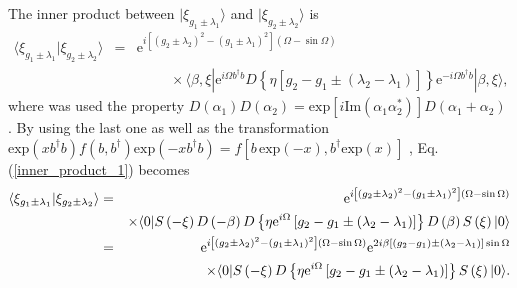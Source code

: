 The inner product between $|\xi_{g_{1}\pm\lambda_{1}}\rangle$ and $|\xi_{g_{2}\pm\lambda_{2}}\rangle$ is
\begin{eqnarray}\label{inner_product_1}
\langle \xi_{g_{1}\pm\lambda_{1}}|\xi_{g_{2}\pm\lambda_{2}}\rangle &=& \textrm{e}^{i\left[\left(g_{2}\pm\lambda_{2}\right)^{2}-\left(g_{1}\pm\lambda_{1}\right)^{2}\right]\left(\Omega-\sin\Omega\right)}\nonumber\\
                                                                     &&\hspace{1cm}\times\langle\beta,\xi|\textrm{e}^{i\Omega b^{\dagger}b}D\left\{\eta\left[g_{2}-g_{1}\pm\left(\lambda_{2}-\lambda_{1}\right)\right]\right\}\textrm{e}^{-i\Omega b^{\dagger}b}|\beta,\xi\rangle,
\end{eqnarray}
where was used the property $D\left(\alpha_{1}\right)D\left(\alpha_{2}\right)=\textrm{exp}\left[i\textrm{Im}\left(\alpha_{1}\alpha_{2}^{*}\right)\right]D\left(\alpha_{1}+\alpha_{2}\right)$ \cite{orszag2016quantum}. By using the last one as well as the transformation $\textrm{exp}\left(xb^{\dagger}b\right)f(b,b^{\dagger})\textrm{exp}\left(-xb^{\dagger}b\right)=f\left[b\,\textrm{exp}\left(-x\right),b^{\dagger}\textrm{exp}\left(x\right)\right]$ \cite{louisell1973quantum}, Eq. (\ref{inner_product_1}) becomes
\begin{eqnarray}\label{inner_product_2}
\langle \xi_{g_{1}\pm\lambda_{1}}|\xi_{g_{2}\pm\lambda_{2}}\rangle &=&\textrm{e}^{i\left[\left(g_{2}\pm\lambda_{2}\right)^{2}-\left(g_{1}\pm\lambda_{1}\right)^{2}\right]\left(\Omega-\sin\Omega\right)}\nonumber\\
                                                                   &&\times\langle 0|S\left(-\xi\right)D\left(-\beta\right)D\left\{\eta\textrm{e}^{i\Omega}\left[g_{2}-g_{1}\pm\left(\lambda_{2}-\lambda_{1}\right)\right]\right\}D\left(\beta\right)S\left(\xi\right)|0\rangle\nonumber\\
                                                                   &=& \textrm{e}^{i\left[\left(g_{2}\pm\lambda_{2}\right)^{2}-\left(g_{1}\pm\lambda_{1}\right)^{2}\right]\left(\Omega-\sin \Omega\right)}\textrm{e}^{2i\beta\left[\left(g_{2}-g_{1}\right)\pm\left(\lambda_{2}-\lambda_{1}\right)\right]\sin\Omega}\nonumber\\
                                                                     &&\hspace{1.5cm}\times\langle 0|S\left(-\xi\right)D\left\{\eta\textrm{e}^{i\Omega}\left[g_{2}-g_{1}\pm\left(\lambda_{2}-\lambda_{1}\right)\right]\right\}S\left(\xi\right)|0\rangle.
\end{eqnarray}
